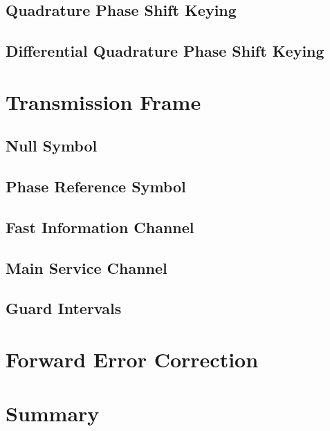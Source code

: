 \documentclass[class=report,11pt,crop=false]{standalone}
\begin{document}
\subsection{Quadrature Phase Shift Keying}
\subsection{Differential Quadrature Phase Shift Keying}


\section{Transmission Frame}


\subsection{Null Symbol}


\subsection{Phase Reference Symbol}


\subsection{Fast Information Channel}


\subsection{Main Service Channel}


\subsection{Guard Intervals}


\section{Forward Error Correction}


\section{Summary}


\ifstandalone

\printnoidxglossary[type=\acronymtype,nonumberlist]
\fi
\end{document}
